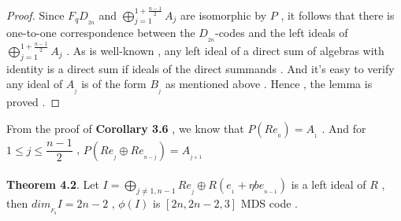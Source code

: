 \documentclass{article}
\begin{document}
\begin{proof}
    Since $F_qD_{_{2n}}$ and $\mathop{\bigoplus}\limits_{j=1}^{1+\frac{n-1}{2}}A_j$ are isomorphic by $P$ , it follows that there is one-to-one correspondence between the $D_{_{2n}}$-codes and the left ideals of $\mathop{\bigoplus}\limits_{j=1}^{1+\frac{n-1}{2}}A_j$ . As is well-known , any left ideal of a direct sum of algebras with identity is a direct sum if ideals of the direct summands . And it's easy to verify any ideal of $A_{_j}$ is of the form $B_{_j}$ as mentioned above . Hence , the lemma is proved . 
\end{proof}
From the proof of \textbf{Corollary 3.6} , we know that $P(Re_{_0})=A_{_1}$ . And for $1\leq j\leq\dfrac{n-1}{2}$ , $P(Re_{_j}\oplus Re_{_{n-j}})=A_{_{j+1}}$\\
\quad\\
\textbf{Theorem 4.2}. Let $I=\mathop{\bigoplus}\limits_{j\neq 1,n-1}Re_{_j}\oplus R(e_{_1}+\eta be_{_{n-1}})$ is a left ideal of $R$ , then $dim_{_{F_q}}I=2n-2$ , $\phi(I)$ is $[2n,2n-2,3]$ MDS code .
\end{document}
